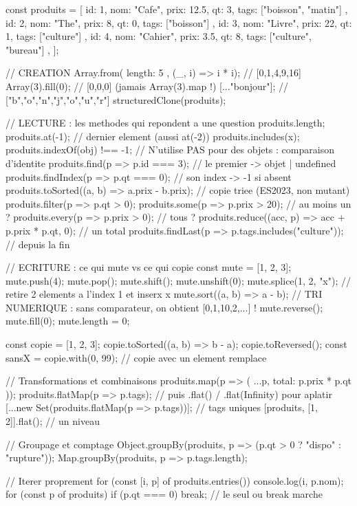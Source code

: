 \documentclass[12pt,a4paper,twoside,openright]{book}
\begin{document}
\begin{codejs}
const produits = [
  { id: 1, nom: "Cafe",   prix: 12.5, qt: 3, tags: ["boisson", "matin"] },
  { id: 2, nom: "The",    prix: 8,    qt: 0, tags: ["boisson"] },
  { id: 3, nom: "Livre",  prix: 22,   qt: 1, tags: ["culture"] },
  { id: 4, nom: "Cahier", prix: 3.5,  qt: 8, tags: ["culture", "bureau"] },
];

// CREATION
Array.from({ length: 5 }, (_, i) => i * i);        // [0,1,4,9,16]
Array(3).fill(0);                                  // [0,0,0]  (jamais Array(3).map !)
[..."bonjour"];                                    // ["b","o","n","j","o","u","r"]
structuredClone(produits);

// LECTURE : les methodes qui repondent a une question
produits.length;
produits.at(-1);            // dernier element (aussi at(-2))
produits.includes(x);
produits.indexOf(obj) !== -1;    // N'utilise PAS pour des objets : comparaison d'identite
produits.find(p => p.id === 3);            // le premier -> objet | undefined
produits.findIndex(p => p.qt === 0);       // son index  -> -1 si absent
produits.toSorted((a, b) => a.prix - b.prix);   // copie triee (ES2023, non mutant)
produits.filter(p => p.qt > 0);
produits.some(p => p.prix > 20);       // au moins un ?
produits.every(p => p.prix > 0);       // tous ?
produits.reduce((acc, p) => acc + p.prix * p.qt, 0);   // un total
produits.findLast(p => p.tags.includes("culture"));    // depuis la fin

// ECRITURE : ce qui mute vs ce qui copie
const mute = [1, 2, 3];
mute.push(4); mute.pop(); mute.shift(); mute.unshift(0);
mute.splice(1, 2, "x");      // retire 2 elements a l'index 1 et inserx x
mute.sort((a, b) => a - b);  // TRI NUMERIQUE : sans comparateur, on obtient [0,1,10,2,...] !
mute.reverse(); mute.fill(0); mute.length = 0;

const copie = [1, 2, 3];
copie.toSorted((a, b) => b - a);
copie.toReversed();
const sansX = copie.with(0, 99);        // copie avec un element remplace

// Transformations et combinaisons
produits.map(p => ({ ...p, total: p.prix * p.qt }));
produits.flatMap(p => p.tags);           // puis .flat() / .flat(Infinity) pour aplatir
[...new Set(produits.flatMap(p => p.tags))];   // tags uniques
[produits, [1, 2]].flat();                // un niveau

// Groupage et comptage
Object.groupBy(produits, p => (p.qt > 0 ? "dispo" : "rupture"));
Map.groupBy(produits, p => p.tags.length);

// Iterer proprement
for (const [i, p] of produits.entries()) console.log(i, p.nom);
for (const p of produits) { if (p.qt === 0) break; }     // le seul ou break marche
\end{codejs}
\end{document}
